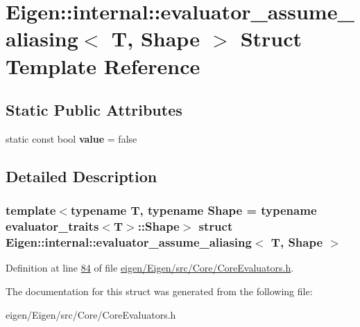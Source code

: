 \hypertarget{struct_eigen_1_1internal_1_1evaluator__assume__aliasing}{}\section{Eigen\+:\+:internal\+:\+:evaluator\+\_\+assume\+\_\+aliasing$<$ T, Shape $>$ Struct Template Reference}
\label{struct_eigen_1_1internal_1_1evaluator__assume__aliasing}
\subsection*{Static Public Attributes}
\begin{DoxyCompactItemize}
\item 
\mbox{\label{struct_eigen_1_1internal_1_1evaluator__assume__aliasing_ae6f9792ea8c123042c30490e45c054f4}} 
static const bool {\bfseries value} = false
\end{DoxyCompactItemize}


\subsection{Detailed Description}
\subsubsection*{template$<$typename T, typename Shape = typename evaluator\+\_\+traits$<$\+T$>$\+::\+Shape$>$\newline
struct Eigen\+::internal\+::evaluator\+\_\+assume\+\_\+aliasing$<$ T, Shape $>$}



Definition at line \hyperlink{eigen_2_eigen_2src_2_core_2_core_evaluators_8h_source_l00084}{84} of file \hyperlink{eigen_2_eigen_2src_2_core_2_core_evaluators_8h_source}{eigen/\+Eigen/src/\+Core/\+Core\+Evaluators.\+h}.



The documentation for this struct was generated from the following file\+:\begin{DoxyCompactItemize}
\item 
eigen/\+Eigen/src/\+Core/\+Core\+Evaluators.\+h\end{DoxyCompactItemize}
